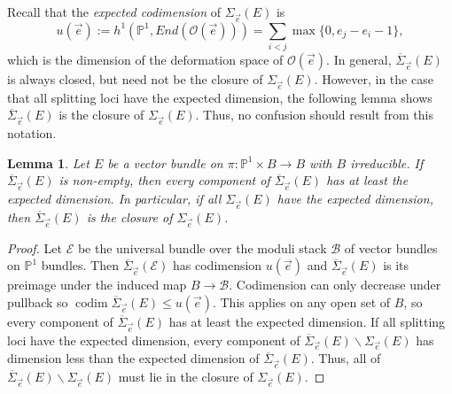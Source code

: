 \documentclass[12pt]{amsart}
\newcommand{\pp}{\mathbb{P}}
\newcommand{\E}{\mathcal{E}}
\renewcommand{\O}{\mathscr{O}}
\newcommand{\B}{\mathcal{B}}
\DeclareMathOperator{\codim}{codim}
\newtheorem{Lemma}[theorem]{Lemma}
\newcommand{\Sigmabar}{\overline{\Sigma}}
\theoremstyle{definition}
\theoremstyle{remark}
\theoremstyle{remark}
\numberwithin{equation}{section}
\begin{document}
Recall that the \textit{expected codimension} of $\Sigma_{\vec{e}}(E)$ is
\[u(\vec{e}) := h^1(\pp^1, End(\O(\vec{e}))) = \sum_{i < j} \max \{0, e_j - e_i - 1\},\]
which is the dimension of the deformation space of $\O(\vec{e})$.
In general, $\overline{\Sigma}_{\vec{e}}(E)$ is always closed, but need not be the closure of $\Sigma_{\vec{e}}(E)$.
However, in the case that all splitting loci have the expected dimension, the following lemma shows $\overline{\Sigma}_{\vec{e}}(E)$ is the closure of $\Sigma_{\vec{e}}(E)$. Thus, no confusion should result from this notation.
\begin{Lemma} \label{low}
Let $E$ be a vector bundle on $\pi: \pp^1 \times B \rightarrow B$ with $B$ irreducible. If $\Sigmabar_{\vec{e}}(E)$ is non-empty, then every component of $\Sigmabar_{\vec{e}}(E)$ has at least the expected dimension. In particular, if all $\Sigma_{\vec{e}}(E)$ have the expected dimension, then $\overline{\Sigma}_{\vec{e}}(E)$ is the closure of $\Sigma_{\vec{e}}(E)$.
\end{Lemma}
\begin{proof}
Let $\E$ be the universal bundle over the moduli stack $\B$ of vector bundles on $\pp^1$ bundles. Then $\Sigmabar_{\vec{e}}(\E)$ has codimension $u(\vec{e})$ and
$\Sigmabar_{\vec{e}}(E)$ is its preimage under the induced map $B \rightarrow \B$. Codimension can only decrease under pullback so $\codim \Sigmabar_{\vec{e}}(E) \leq u(\vec{e})$. This applies on any open set of $B$, so every component of $\Sigmabar_{\vec{e}}(E)$ has at least the expected dimension.
If all splitting loci have the expected dimension, every component of $\Sigmabar_{\vec{e}}(E) \backslash \Sigma_{\vec{e}}(E)$ has dimension less than the expected dimension of $\Sigmabar_{\vec{e}}(E)$. Thus, all of $\Sigmabar_{\vec{e}}(E) \backslash \Sigma_{\vec{e}}(E)$ must lie in the closure of $ \Sigma_{\vec{e}}(E)$.
\end{proof}
\end{document}
